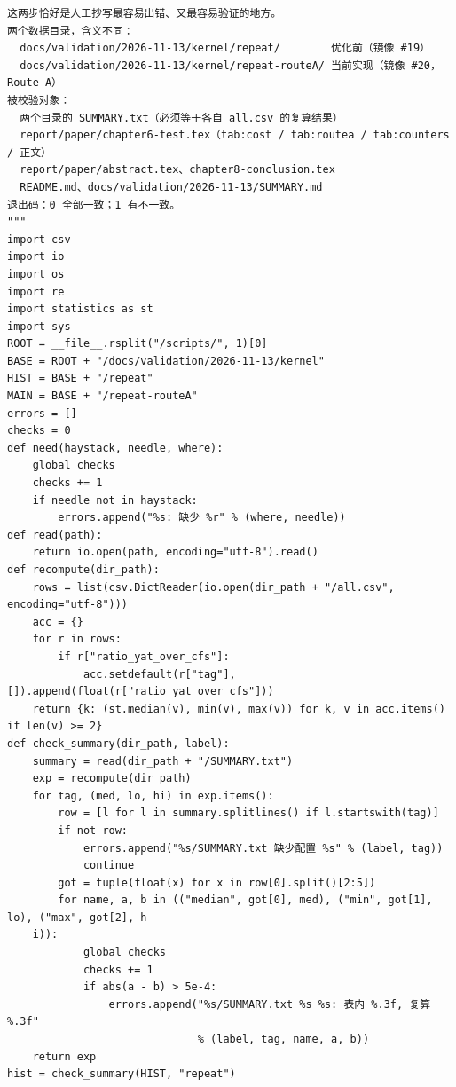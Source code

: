 \documentclass[10pt,a4paper]{article}
\newenvironment{yatpage}{\vspace*{0pt}}{\par}
\begin{document}
\begin{yatpage}
\begin{Verbatim}[fontsize=\fontsize{8.2}{9.8}\selectfont]
这两步恰好是人工抄写最容易出错、又最容易验证的地方。
两个数据目录，含义不同：
  docs/validation/2026-11-13/kernel/repeat/        优化前（镜像 #19）
  docs/validation/2026-11-13/kernel/repeat-routeA/ 当前实现（镜像 #20，Route A）
被校验对象：
  两个目录的 SUMMARY.txt（必须等于各自 all.csv 的复算结果）
  report/paper/chapter6-test.tex（tab:cost / tab:routea / tab:counters / 正文）
  report/paper/abstract.tex、chapter8-conclusion.tex
  README.md、docs/validation/2026-11-13/SUMMARY.md
退出码：0 全部一致；1 有不一致。
"""
import csv
import io
import os
import re
import statistics as st
import sys
ROOT = __file__.rsplit("/scripts/", 1)[0]
BASE = ROOT + "/docs/validation/2026-11-13/kernel"
HIST = BASE + "/repeat"
MAIN = BASE + "/repeat-routeA"
errors = []
checks = 0
def need(haystack, needle, where):
    global checks
    checks += 1
    if needle not in haystack:
        errors.append("%s: 缺少 %r" % (where, needle))
def read(path):
    return io.open(path, encoding="utf-8").read()
def recompute(dir_path):
    rows = list(csv.DictReader(io.open(dir_path + "/all.csv", encoding="utf-8")))
    acc = {}
    for r in rows:
        if r["ratio_yat_over_cfs"]:
            acc.setdefault(r["tag"], []).append(float(r["ratio_yat_over_cfs"]))
    return {k: (st.median(v), min(v), max(v)) for k, v in acc.items() if len(v) >= 2}
def check_summary(dir_path, label):
    summary = read(dir_path + "/SUMMARY.txt")
    exp = recompute(dir_path)
    for tag, (med, lo, hi) in exp.items():
        row = [l for l in summary.splitlines() if l.startswith(tag)]
        if not row:
            errors.append("%s/SUMMARY.txt 缺少配置 %s" % (label, tag))
            continue
        got = tuple(float(x) for x in row[0].split()[2:5])
        for name, a, b in (("median", got[0], med), ("min", got[1], lo), ("max", got[2], h
    i)):
            global checks
            checks += 1
            if abs(a - b) > 5e-4:
                errors.append("%s/SUMMARY.txt %s %s: 表内 %.3f, 复算 %.3f"
                              % (label, tag, name, a, b))
    return exp
hist = check_summary(HIST, "repeat")
\end{Verbatim}
\end{yatpage}
\newpage
\end{document}
